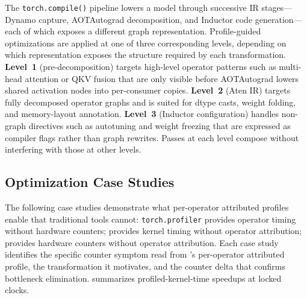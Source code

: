 The \texttt{torch.compile()} pipeline lowers a model through successive IR stages---Dynamo
capture, AOTAutograd decomposition, and Inductor code generation---each of which exposes
a different graph representation.  Profile-guided optimizations are applied at one of three
corresponding levels, depending on which representation exposes the structure required by
each transformation.
\textbf{Level~1} (pre-decomposition) targets high-level operator patterns such as
multi-head attention or QKV fusion that are only visible before AOTAutograd lowers
shared activation nodes into per-consumer copies.  \textbf{Level~2} (Aten IR)
targets fully decomposed operator graphs and is suited for dtype casts, weight
folding, and memory-layout annotation.  \textbf{Level~3} (Inductor configuration)
handles non-graph directives such as autotuning and weight freezing that are
expressed as compiler flags rather than graph rewrites.  Passes at each level
compose without interfering with those at other levels.

\subsection{Optimization Case Studies}
\label{sec:validation}

The following case studies demonstrate what per-operator attributed profiles enable that
traditional tools cannot: \texttt{torch.profiler} provides operator timing without hardware
counters; \nsys provides kernel timing without operator attribution; \ncu provides hardware
counters without operator attribution.  Each case study identifies the specific counter
symptom read from \sys's per-operator attributed profile, the transformation it motivates,
and the counter delta that confirms bottleneck elimination.   summarizes
profiled-kernel-time speedups at locked clocks.

